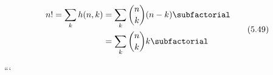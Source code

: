

\begin{equation}
\begin{aligned}
n!=\sum_k h(n,k) &= \sum_k \binom{n}{k}(n-k)\subfactorial\\
  &=\sum_k\binom{n}{k}k\subfactorial
\end{aligned}
\tag{5.49}
\end{equation}

```
